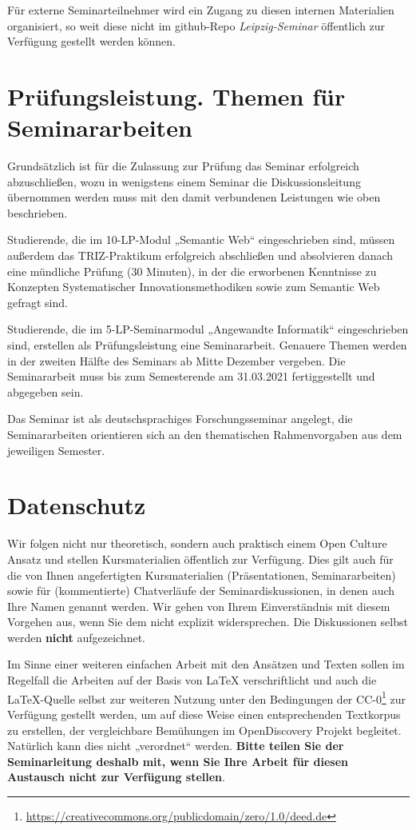 \documentclass[11pt,a4paper]{article}
\begin{document}
Für externe Seminarteilnehmer wird ein Zugang zu diesen internen Materialien
organisiert, so weit diese nicht im github-Repo \emph{Leipzig-Seminar}
öffentlich zur Verfügung gestellt werden können.

\section{Prüfungsleistung. Themen für Seminararbeiten}

Grundsätzlich ist für die Zulassung zur Prüfung das Seminar erfolgreich
abzuschließen, wozu in wenigstens einem Seminar die Diskussionsleitung
übernommen werden muss mit den damit verbundenen Leistungen wie oben
beschrieben.

Studierende, die im 10-LP-Modul „Semantic Web“ eingeschrieben sind, müssen
außerdem das TRIZ-Praktikum erfolgreich abschließen und absolvieren danach
eine mündliche Prüfung (30 Minuten), in der die erworbenen Kenntnisse zu
Konzepten Systematischer Innovationsmethodiken sowie zum Semantic Web gefragt
sind.

Studierende, die im 5-LP-Seminarmodul „Angewandte Informatik“ eingeschrieben
sind, erstellen als Prüfungsleistung eine Seminararbeit. Genauere Themen
werden in der zweiten Hälfte des Seminars ab Mitte Dezember vergeben. Die
Seminararbeit muss bis zum Semesterende am 31.03.2021 fertiggestellt und
abgegeben sein. 

Das Seminar ist als deutschsprachiges Forschungsseminar angelegt, die
Seminararbeiten orientieren sich an den thematischen Rahmenvorgaben aus dem
jeweiligen Semester.

\section{Datenschutz}

Wir folgen nicht nur theoretisch, sondern auch praktisch einem Open Culture
Ansatz und stellen Kursmaterialien öffentlich zur Verfügung.  Dies gilt auch
für die von Ihnen angefertigten Kursmaterialien (Präsentationen,
Seminararbeiten) sowie für (kommentierte) Chatverläufe der
Seminardiskussionen, in denen auch Ihre Namen genannt werden.  Wir gehen von
Ihrem Einverständnis mit diesem Vorgehen aus, wenn Sie dem nicht explizit
widersprechen.  Die Diskussionen selbst werden \textbf{nicht} aufgezeichnet.

Im Sinne einer weiteren einfachen Arbeit mit den Ansätzen und Texten sollen im
Regelfall die Arbeiten auf der Basis von {\LaTeX} verschriftlicht und auch die
\LaTeX-Quelle selbst zur weiteren Nutzung unter den Bedingungen der
CC-0\footnote{\url{https://creativecommons.org/publicdomain/zero/1.0/deed.de}}
zur Verfügung gestellt werden, um auf diese Weise einen entsprechenden
Textkorpus zu erstellen, der vergleichbare Bemühungen im OpenDiscovery Projekt
begleitet.  Natürlich kann dies nicht „verordnet“ werden. \textbf{Bitte teilen
  Sie der Seminarleitung deshalb mit, wenn Sie Ihre Arbeit für diesen
  Austausch nicht zur Verfügung stellen}.
\end{document}
